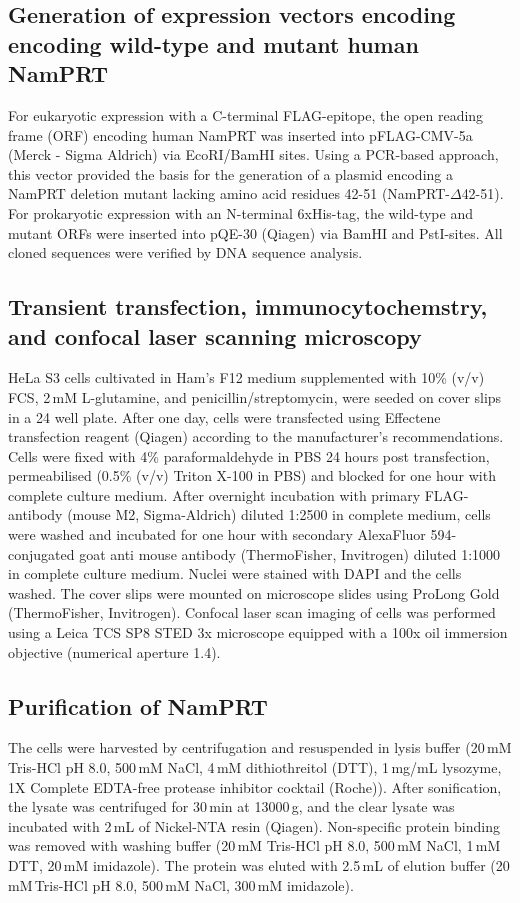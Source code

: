 \subsection{Generation of expression vectors encoding encoding wild-type and mutant human NamPRT}

For eukaryotic expression with a C-terminal FLAG-epitope, the open reading frame (ORF) encoding human NamPRT was inserted into pFLAG-CMV-5a (Merck - Sigma Aldrich) via EcoRI/BamHI sites. Using a PCR-based approach, this vector provided the basis for the generation of a plasmid encoding a NamPRT deletion mutant lacking amino acid residues 42-51 (NamPRT-$\Delta$42-51). For prokaryotic expression with an N-terminal 6xHis-tag, the wild-type and mutant ORFs were inserted into pQE-30 (Qiagen) via BamHI and PstI-sites. All cloned sequences were verified by DNA sequence analysis.


\subsection{Transient transfection, immunocytochemstry, and confocal laser scanning microscopy}

HeLa S3 cells cultivated in Ham’s F12 medium supplemented with 10\% (v/v) FCS, 2\,mM L-glutamine, and penicillin/streptomycin, were seeded on cover slips in a 24 well plate. After one day, cells were transfected using Effectene transfection reagent (Qiagen) according to the manufacturer’s recommendations. Cells were fixed with 4\% paraformaldehyde in PBS 24 hours post transfection, permeabilised (0.5\% (v/v) Triton X-100 in PBS) and blocked for one hour with complete culture medium. After overnight incubation with primary FLAG-antibody (mouse M2, Sigma-Aldrich) diluted 1:2500 in complete medium, cells were washed and incubated for one hour with secondary AlexaFluor 594-conjugated goat anti mouse antibody (ThermoFisher, Invitrogen) diluted 1:1000 in complete culture medium. Nuclei were stained with DAPI and the cells washed. The cover slips were mounted on microscope slides using ProLong Gold (ThermoFisher, Invitrogen). Confocal laser scan imaging of cells was performed using a Leica TCS SP8 STED 3x microscope equipped with a 100x oil immersion objective (numerical aperture 1.4).


\subsection{Purification of NamPRT}

The cells were harvested by centrifugation and resuspended in lysis buffer (20\,mM Tris-HCl pH 8.0, 500\,mM NaCl, 4\,mM dithiothreitol (DTT), 1\,mg/mL lysozyme, 1X Complete EDTA-free protease inhibitor cocktail (Roche)). After sonification, the lysate was centrifuged for 30\,min at 13000\,g, and the clear lysate was incubated with 2\,mL of Nickel-NTA resin (Qiagen). Non-specific protein binding was removed with washing buffer (20\,mM Tris-HCl pH 8.0, 500\,mM NaCl, 1\,mM DTT, 20\,mM imidazole). The protein was eluted with 2.5\,mL of elution buffer (20 mM\,Tris-HCl pH 8.0, 500\,mM NaCl, 300\,mM imidazole).

